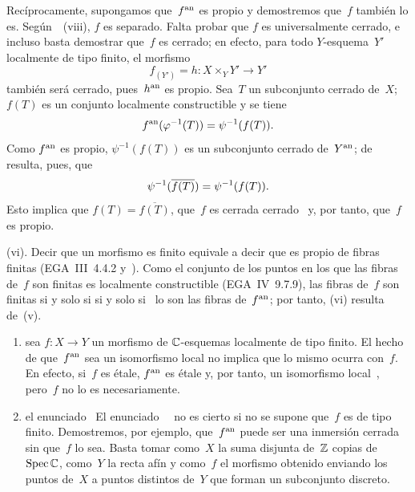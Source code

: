 Recíprocamente, supongamos que~$f^{\mathrm{an}}$ es propio y demostremos que~$f$
también lo es. Según~~(viii), $f$ es separado. Falta probar que
$f$ es universalmente cerrado, e incluso basta demostrar que~$f$ es cerrado;
en efecto, para todo $Y$-esquema~$Y'$ localmente de tipo finito, el morfismo
$$
f_{(Y')}=h\colon X\times_YY'\to Y'
$$
también será cerrado, pues~$h^{\mathrm{an}}$ es propio. Sea~$T$ un subconjunto cerrado
de~$X$; $f(T)$ es un conjunto localmente constructible y se tiene
$$
f^{\mathrm{an}}(\varphi^{-1}(T))=\psi^{-1}(f(T)).
$$
Como
$f^{\mathrm{an}}$ es propio, $\psi^{-1}(f(T))$ es un subconjunto cerrado de~$Y^{\mathrm{an}}$;
de~ resulta, pues, que
$$
\psi^{-1}(\overline{f(T)})=\psi^{-1}(f(T)).
$$
Esto implica que $f(T)=\overline{f(T)}$, \ie que~$f$ es
{cerrada}
{cerrado}%
~y, por tanto, que~$f$ es propio.

(vi). Decir que un morfismo es finito equivale a decir que es propio de
fibras finitas (EGA~III~4.4.2 y~\cite[ \S 5]{XII.4}). Como el conjunto
de los puntos en los que las fibras de~$f$ son finitas es localmente
constructible (EGA~IV~9.7.9), las fibras de~$f$ son finitas
{si y solo si}
{si y solo si}%
~lo son las fibras de~$f^{\mathrm{an}}$; por tanto, (vi) resulta de~(v).

\begin{remarque}
\label{XII.3.3}
\begin{enumerate}
\item[a)] sea $f\colon X\to Y$ un morfismo de $\mathbb C$-esquemas localmente de
tipo finito. El hecho de que~$f^{\mathrm{an}}$ sea un isomorfismo local no implica que
lo mismo ocurra con~$f$. En efecto, si~$f$ es étale, $f^{\mathrm{an}}$ es étale y, por
tanto, un isomorfismo local~\hbox{\cite[ \S 1]{XII.4}}, pero~$f$ no lo es
necesariamente.
\item[b)]
{el enunciado~}
{El enunciado~}%
~no es cierto si no se supone que~$f$ es de tipo finito. Demostremos, por
ejemplo, que~$f^{\mathrm{an}}$ puede ser una inmersión cerrada sin que~$f$ lo sea. Basta
tomar como~$X$ la suma disjunta de~$\mathbb Z$ copias de~$\operatorname{Spec}\mathbb C$, como~$Y$ la
recta afín y como~$f$ el morfismo obtenido enviando los puntos de~$X$ a
puntos distintos de~$Y$ que forman un subconjunto discreto.
\end{enumerate}
\end{remarque}
